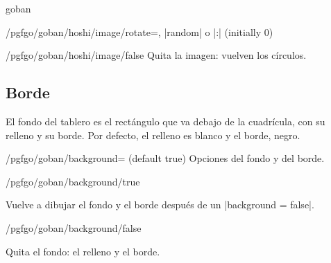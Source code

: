 \begin{environment}{{goban}}
\begin{key}{/pgfgo/goban/hoshi/image/rotate=, |random| o |:| (initially 0)}
		\begin{codeexample}[]
			\begin{goban}[9, hoshi = {image = {file = pgfgo-hoshi.png, width = 8pt}}]
			\end{goban}

			\begin{goban}[9, hoshi = {image = {file = pgfgo-hoshi.png, width = 8pt, rotate = 45}}]
			\end{goban}
		\end{codeexample}
	\end{key}

	\begin{stylekey}{/pgfgo/goban/hoshi/image/false}
		Quita la imagen: vuelven los círculos.
	\end{stylekey}

	\subsection{Borde}
	
	El fondo del tablero es el rectángulo que va debajo de la cuadrícula, con su relleno y su borde. Por defecto, el relleno es blanco y el borde, negro.
	
	\begin{key}{/pgfgo/goban/background= (default true)}
		Opciones del fondo y del borde.
	\end{key}
	
	\begin{stylekey}{/pgfgo/goban/background/true}

		Vuelve a dibujar el fondo y el borde después de un |background = false|.
	\end{stylekey}

	\begin{stylekey}{/pgfgo/goban/background/false}
		
		Quita el fondo: el relleno y el borde.
		
		\begin{codeexample}[]
			
			\begin{goban}[name = a]
			\end{goban}
			
			\begin{goban}[background = false, resume = a]
			\end{goban}
		\end{codeexample}
	\end{stylekey}
	

\end{environment}

